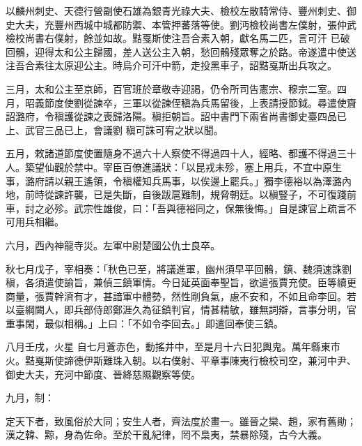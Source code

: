 \begin{pinyinscope}
 以麟州刺史、天德行營副使石雄為銀青光祿大夫、檢校左散騎常侍、豐州刺史、御史大夫，充豐州西城中城都防禦、本管押蕃落等使。劉沔檢校尚書左僕射，張仲武檢校尚書右僕射，餘並如故。黠戛斯使注吾合素入朝，獻名馬二匹，言可汗
 已破回鶻，迎得太和公主歸國，差人送公主入朝，愁回鶻殘眾奪之於路。帝遂遣中使送注吾合素往太原迎公主。時烏介可汗中箭，走投黑車子，詔黠戛斯出兵攻之。



 三月，太和公主至京師，百官班於章敬寺迎謁，仍令所司告憲宗、穆宗二室。四月，昭義節度使劉從諫卒，三軍以從諫侄稹為兵馬留後，上表請授節鉞。尋遣使齎詔潞府，令稹護從諫之喪歸洛陽。稹拒朝旨。詔中書門下兩省尚書御史臺四品已上、武官三品已上，會議劉
 稹可誅可宥之狀以聞。



 五月，敕諸道節度使置隨身不過六十人察使不得過四十人，經略、都護不得過三十人。築望仙觀於禁中。宰臣百僚進議狀：「以昆戎未殄，塞上用兵，不宜中原生事，潞府請以親王遙領，令稹權知兵馬事，以俟邊上罷兵。」獨李德裕以為澤潞內地，前時從諫許襲，已是失斷，自後跋扈難制，規脅朝廷。以稹豎子，不可復踐前車，討之必殄。武宗性雄俊，曰：「吾與德裕同之，保無後悔。」自是諫官上疏言不可用兵相繼。



 六月，西內神龍寺災。左軍中尉楚國公仇士良卒。



 秋七月戊子，宰相奏：「秋色已至，將議進軍，幽州須早平回鶻，鎮、魏須速誅劉稹，各須遣使諭旨，兼偵三鎮軍情。今日延英面奉聖旨，欲遣張賈充使。臣等續更商量，張賈幹濟有才，甚諳軍中體勢，然性剛負氣，慮不安和，不如且命李回。若以臺綱闕人，即兵部侍郎鄭涯久為征鎮判官，情甚精敏，雖無詞辯，言事分明，官重事閑，最似相稱。」上曰：「不如令李回去。」即遣回奉使三鎮。



 八月壬戌，火星
 自七月蒼赤色，動搖井中，至是月十六日犯輿鬼。萬年縣東市火。黠戛斯使諦德伊斯難珠入朝。以右僕射、平章事陳夷行檢校司空，兼河中尹、御史大夫，充河中節度、晉絳慈隰觀察等使。



 九月，制：



 定天下者，致風俗於大同；安生人者，齊法度於畫一。雖晉之欒、趙，家有舊勛；漢之韓、黥，身為佐命。至於干亂紀律，罔不梟夷，禁暴除殘，古今大義。




\end{pinyinscope}
